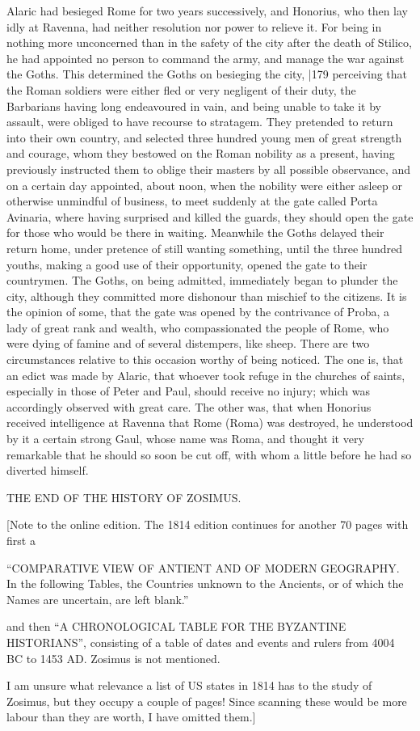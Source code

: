 Alaric had besieged Rome for two years successively, and Honorius, who then lay idly at Ravenna, had neither resolution nor power to relieve it. For being in nothing more unconcerned than in the safety of the city after the death of Stilico, he had appointed no person to command the army, and manage the war against the Goths. This determined the Goths on besieging the city,
|179 perceiving that the Roman soldiers were either fled or very negligent of their duty, the Barbarians having long endeavoured in vain, and being unable to take it by assault, were obliged to have recourse to stratagem. They pretended to return into their own country, and selected three hundred young men of great strength and courage, whom they bestowed on the Roman nobility as a present, having previously instructed them to oblige their masters by all possible observance, and on a certain day appointed, about noon, when the nobility were either asleep or otherwise unmindful of business, to meet suddenly at the gate called Porta Avinaria, where having surprised and killed the guards, they should open the gate for those who would be there in waiting. Meanwhile the Goths delayed their return home, under pretence of still wanting something, until the three hundred youths, making a good use of their opportunity, opened the gate to their countrymen. The Goths, on being admitted, immediately began to plunder the city, although they committed more dishonour than mischief to the citizens. It is the opinion of some, that the gate was opened by the contrivance of Proba, a lady of great rank and wealth, who compassionated the people of Rome, who were dying of famine and of several distempers, like sheep. There are two circumstances relative to this occasion worthy of being noticed. The one is, that an edict was made by Alaric, that whoever took refuge in the churches of saints, especially in those of Peter and Paul, should receive no injury; which was accordingly observed with great care. The other was, that when Honorius received intelligence at Ravenna that Rome (Roma) was destroyed, he understood by it a certain strong Gaul, whose name was Roma, and thought it very remarkable that he should so soon be cut off, with whom a little before he had so diverted himself.

THE END OF THE HISTORY OF ZOSIMUS.

[Note to the online edition. The 1814
edition continues for another 70 pages with first a

``COMPARATIVE VIEW OF ANTIENT AND OF MODERN GEOGRAPHY. In the following Tables, the Countries unknown to the Ancients, or of which the Names are uncertain, are left blank.''

and then ``A CHRONOLOGICAL TABLE FOR THE BYZANTINE HISTORIANS'',
consisting of a table of dates and events and rulers from 4004 BC to 1453
AD. Zosimus is not mentioned.

I am unsure what relevance a list of US states in 1814 has to the study of
Zosimus, but they occupy a couple of pages! Since scanning these would be
more labour than they are worth, I have omitted them.]
